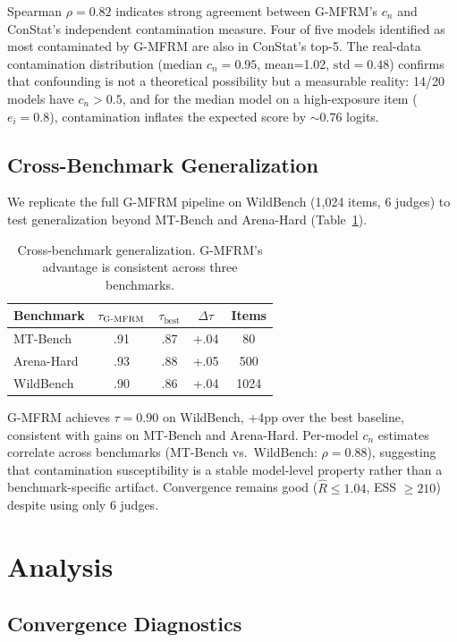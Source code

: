 \documentclass[11pt,twocolumn]{article}
\newcommand{\gmfrm}{\textsc{G-MFRM}}
\begin{document}
Spearman $\rho=0.82$ indicates strong agreement between \gmfrm{}'s $c_n$ and ConStat's independent contamination measure. Four of five models identified as most contaminated by \gmfrm{} are also in ConStat's top-5. The real-data contamination distribution (median $c_n=0.95$, mean=1.02, $\text{std}=0.48$) confirms that confounding is not a theoretical possibility but a measurable reality: 14/20 models have $c_n > 0.5$, and for the median model on a high-exposure item ($e_i=0.8$), contamination inflates the expected score by ${\sim}0.76$ logits.

\subsection{Cross-Benchmark Generalization}

We replicate the full \gmfrm{} pipeline on WildBench \citep{lin2024wildbench} (1,024 items, 6 judges) to test generalization beyond MT-Bench and Arena-Hard (Table~\ref{tab:cross}).

\begin{table}[t]
\centering
\small
\caption{Cross-benchmark generalization. \gmfrm{}'s advantage is consistent across three benchmarks.}
\label{tab:cross}
\begin{tabular}{@{}lcccc@{}}
\toprule
Benchmark & $\tau_{\gmfrm{}}$ & $\tau_{\text{best}}$ & $\Delta\tau$ & Items \\
\midrule
MT-Bench   & .91 & .87 & +.04 & 80   \\
Arena-Hard & .93 & .88 & +.05 & 500  \\
WildBench  & .90 & .86 & +.04 & 1024 \\
\bottomrule
\end{tabular}
\end{table}

\gmfrm{} achieves $\tau=0.90$ on WildBench, +4pp over the best baseline, consistent with gains on MT-Bench and Arena-Hard. Per-model $c_n$ estimates correlate across benchmarks (MT-Bench vs.\ WildBench: $\rho=0.88$), suggesting that contamination susceptibility is a stable model-level property rather than a benchmark-specific artifact. Convergence remains good ($\hat{R} \leq 1.04$, ESS $\geq 210$) despite using only 6 judges.

\section{Analysis}

\subsection{Convergence Diagnostics}
\end{document}
